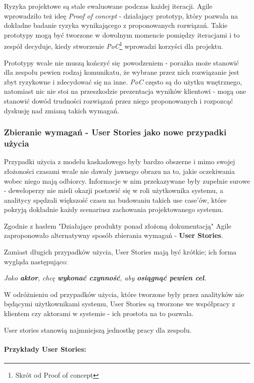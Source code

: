 \documentclass{article}
\begin{document}
Ryzyka projektowe są stale ewaluowane podczas każdej iteracji. Agile wprowadziło też ideę \textit{Proof of concept} - działający prototyp, który pozwala na dokładne badanie ryzyka wynikającego z proponowanych rozwiązań. Takie prototypy mogą być tworzone w dowolnym momencie pomiędzy iteracjami i to zespół decyduje, kiedy stworzenie \textit{PoC}\footnote{Skrót od Proof of concept} wprowadzi korzyści dla projektu.

Prototypy wcale nie muszą kończyć się powodzeniem - porażka może stanowić dla zespołu pewien rodzaj komunikatu, że wybrane przez nich rozwiązanie jest zbyt ryzykowne i zdecydować się na inne. \textit{PoC} często są do użytku wnętrznego, natomiast nic nie stoi na przeszkodzie prezentacja wyników klientowi - mogą one stanowić dowód trudności rozwiązań przez niego proponowanych i rozpozcąć dyskusję nad zmianą takich wymagań.

\subsubsection*{Zbieranie wymagań - User Stories jako nowe przypadki użycia}
Przypadki użycia z modelu kaskadowego były bardzo obszerne i mimo swojej złożoności czasami wcale nie dawały jawnego obrazu na to, jakie oczekiwania wobec niego mają odbiorcy. Informacje w nim przekazywane były zupełnie surowe - deweloperzy nie mieli okazji postawić się w roli użytkownika systemu, a analitycy spędzali większość czasu na budowaniu takich use case'ów, które pokryją dokładnie każdy scenariusz zachowania projektowanego systemu.

Zgodnie z hasłem "Działające produkty ponad złożoną dokumentacją" Agile zaproponowało alternatywny sposób zbierania wymagań - \textbf{User Stories}.

Zamiast długich przypadków użycia, User Stories mają być krótkie; ich forma wygląda następująco:

\begin{center}
    \textit{Jako \textbf{aktor}, chcę \textbf{wykonać czynność}, aby \textbf{osiągnąć pewien cel}.}
\end{center}

W odróżnieniu od przypadków użycia, które tworzone były przez analityków nie będącymi użytkownikami systemu, User Stories są tworzone we współpracy z klientem czy aktorami w systemie - ich prostota na to pozwala.

User stories stanowią najmniejszą jednostkę pracy dla zespołu.

\paragraph{Przykłady User Stories:}
\end{document}
